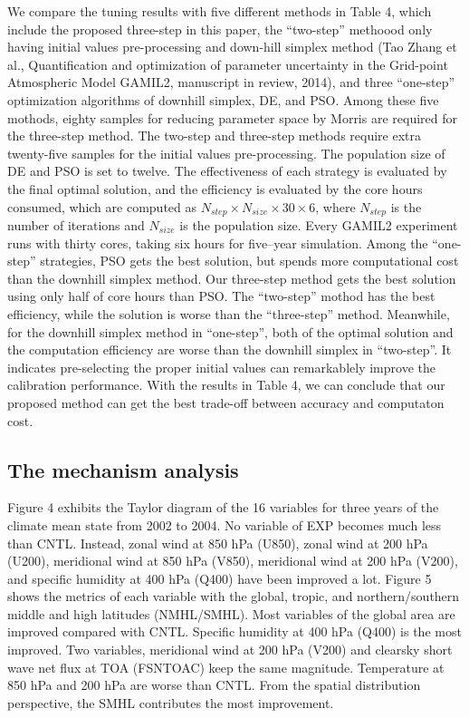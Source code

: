 \documentclass[gmd, manuscript]{copernicus}
\begin{document}
We compare the tuning results with five different methods in Table 4, which include the proposed three-step in this paper,  the ``two-step'' methoood only having initial values pre-processing and down-hill simplex method (Tao Zhang et al., Quantification and optimization of parameter uncertainty in the Grid-point Atmospheric Model GAMIL2, manuscript in review, 2014), and three ``one-step'' optimization algorithms of downhill simplex, DE, and PSO. Among these five mothods, eighty samples for reducing parameter space by Morris are required for the three-step method. The two-step and three-step methods require extra twenty-five samples for the initial values pre-processing. The population size of DE and PSO is set to twelve. The effectiveness of each strategy is evaluated by the final optimal solution, and the efficiency is evaluated by the core hours consumed, which are computed as $N_{step} \times N_{size} \times 30 \times 6$, where $N_{step}$ is the number of iterations and $N_{size}$ is the population size. Every GAMIL2 experiment runs  with thirty cores, taking six hours for five–year simulation. Among the ``one-step'' strategies, PSO gets the best solution, but spends more computational cost than the downhill simplex method. Our three-step method gets the best solution using only half of core hours than PSO. The ``two-step'' mothod has the best efficiency, while the solution is worse than the ``three-step'' method. Meanwhile, for the downhill simplex method in “one-step”, both of the optimal solution and the computation efficiency are worse than the  downhill simplex in “two-step”. It indicates pre-selecting the proper initial values can remarkablely improve the calibration performance. With the results in Table 4, we can conclude that our proposed method can get the best trade-off between accuracy and computaton cost.



\subsection{The mechanism analysis}

Figure 4 exhibits the Taylor diagram of the 16 variables for three years of the climate mean state from 2002 to 2004.  No variable of EXP becomes much less than CNTL. Instead,  zonal wind at 850 hPa (U850),  zonal wind at 200 hPa (U200), meridional wind at 850 hPa (V850), meridional wind at 200 hPa (V200), and specific humidity at 400 hPa (Q400) have been improved a lot. Figure 5 shows the metrics of each variable with the global, tropic, and northern/southern middle and high latitudes (NMHL/SMHL). Most variables of the global area are improved compared with CNTL. Specific humidity at 400 hPa (Q400) is the most improved. Two variables, meridional wind at 200 hPa (V200) and clearsky short wave net flux at TOA (FSNTOAC) keep the same magnitude. Temperature  at 850 hPa and 200 hPa are worse than CNTL. From the spatial distribution perspective, the SMHL contributes the most improvement.
\end{document}
